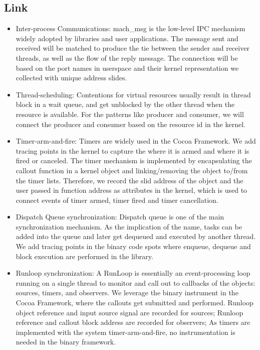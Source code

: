\subsection{Link}
\begin{itemize}
        \item Inter-process Communications: mach\_msg is the low-level IPC
        mechanism widely adopted by libraries and user applications. The
        message sent and received will be matched to produce the tie between
        the sender and receiver threads, as well as the flow of the reply
        message. The connection will be based on the port names in userspace
        and their kernel representation we collected with unique address
        slides.
        
        \item Thread-scheduling: Contentions for virtual resources usually
        result in thread block in a wait queue, and get unblocked by the other
        thread when the resource is available. For the patterns like producer
        and consumer, we will connect the producer and consumer based on the
        resource id in the kernel. %

        \item Timer-arm-and-fire: Timers are widely used in the Cocoa
        Framework. We add tracing points in the kernel to capture the where it
        is armed and where it is fired or canceled. The timer mechanism is
        implemented by encapsulating the callout function in a kernel object
        and linking/removing the object to/from the timer lists. Therefore, we
        record the slid address of the object and the user passed in function
        address as attributes in the kernel, which is used to connect events of
        timer armed, timer fired and timer cancellation.

        \item Dispatch Queue synchronization: Dispatch queue is one of the main
        synchronization mechanism. As the implication of the name, tasks can be
        added into the queue and later get dequeued and executed by another
        thread. We add tracing points in the binary code spots where enqueue,
        dequeue and block execution are performed in the library.

        \item Runloop synchronization: A RunLoop is essentially an
        event-processing loop running on a single thread to monitor and call
        out to callbacks of the objects: sources, timers, and observers. We
        leverage the binary instrument in the Cocoa Framework, where the
        callouts get submitted and performed. Runloop object reference and
        input source signal are recorded for sources; Runloop reference and
        callout block address are recorded for observers; As timers are
        implemented with the system timer-arm-and-fire, no instrumentation is
        needed in the binary framework.


\end{itemize}
